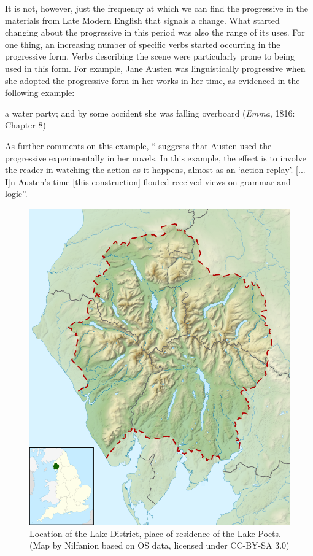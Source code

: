 It is not, however, just the frequency at which we can find the progressive in the materials from Late Modern English that signals a change. What started changing about the progressive in this period was also the range of its uses. For one thing, an increasing number of specific verbs started occurring in the progressive form. Verbs describing the scene were particularly prone to being used in this form. For example, Jane Austen was linguistically progressive when she adopted the progressive form in her works in her time, as evidenced in the following example:

\begin{exe}
    \ex a water party; and by some accident she was falling overboard (\textit{Emma}, 1816: Chapter 8)
\end{exe}

As \citet[79]{Beal2004} further comments on this example, ``\citet{Strang1970} suggests that Austen used the progressive experimentally in her novels. In this example, the effect is to involve the reader in watching the action as it happens, almost as an `action replay'. {[}... I{]}n Austen's time {[}this construction{]} flouted received views on grammar and logic''.

\begin{figure}
    \vspace{-10pt}
    \includegraphics[scale=0.6]{chapters/img/Lake_District.png}
    \caption{Location of the Lake District, place of residence of the Lake Poets. (Map by Nilfanion based on OS data, licensed under CC-BY-SA 3.0)}
    \label{fig:LakeDistrict}
\end{figure}


